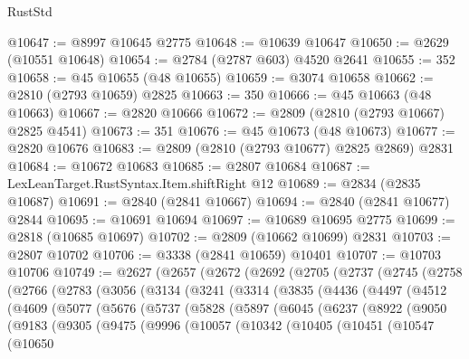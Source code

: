 \begin{lexlean}{RustStd}
\begin{coremodule}
@10647 := @8997 @10645 @2775
@10648 := @10639 @10647
@10650 := @2629 (@10551 @10648)
@10654 := @2784 (@2787 @603) @4520 @2641
@10655 := 352
@10658 := @45 @10655 (@48 @10655)
@10659 := @3074 @10658
@10662 := @2810 (@2793 @10659) @2825
@10663 := 350
@10666 := @45 @10663 (@48 @10663)
@10667 := @2820 @10666
@10672 := @2809 (@2810 (@2793 @10667) @2825 @4541)
@10673 := 351
@10676 := @45 @10673 (@48 @10673)
@10677 := @2820 @10676
@10683 := @2809 (@2810 (@2793 @10677) @2825 @2869) @2831
@10684 := @10672 @10683
@10685 := @2807 @10684
@10687 := LexLeanTarget.RustSyntax.Item.shiftRight @12
@10689 := @2834 (@2835 @10687)
@10691 := @2840 (@2841 @10667)
@10694 := @2840 (@2841 @10677) @2844
@10695 := @10691 @10694
@10697 := @10689 @10695 @2775
@10699 := @2818 (@10685 @10697)
@10702 := @2809 (@10662 @10699) @2831
@10703 := @2807 @10702
@10706 := @3338 (@2841 @10659) @10401
@10707 := @10703 @10706
@10749 := @2627
    (@2657
      (@2672
        (@2692
          (@2705
            (@2737
              (@2745
                (@2758
                  (@2766
                    (@2783
                      (@3056
                        (@3134
                          (@3241
                            (@3314
                              (@3835
                                (@4436
                                  (@4497
                                    (@4512
                                      (@4609
                                        (@5077
                                          (@5676
                                            (@5737
                                              (@5828
                                                (@5897
                                                  (@6045
                                                    (@6237
                                                      (@8922
                                                        (@9050
                                                          (@9183
                                                            (@9305
                                                              (@9475
                                                                (@9996
                                                                  (@10057
                                                                    (@10342
                                                                      (@10405
                                                                        (@10451
                                                                          (@10547
                                                                            (@10650

\end{coremodule}
\end{lexlean}
